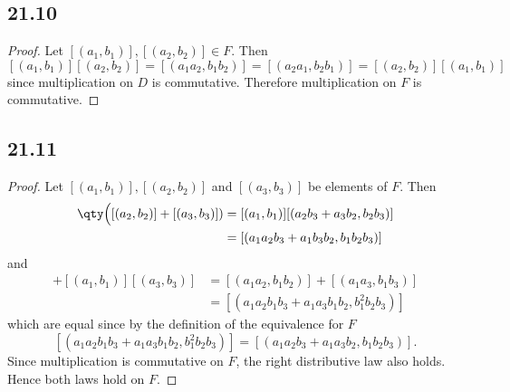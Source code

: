 \documentclass[12pt,titlepage]{extarticle}
\begin{document}
\subsection*{21.10}
\begin{proof}
    Let $[(a_1,b_1)], [(a_2, b_2)] \in F$. Then
    \[
        [(a_1, b_1)][(a_2, b_2)] = [(a_1 a_2, b_1 b_2)] = [(a_2 a_1, b_2 b_1)] = [(a_2, b_2)] [(a_1, b_1)]
    \]
    since multiplication on $D$ is commutative. Therefore multiplication on $F$ is commutative.
\end{proof}

\subsection*{21.11}
\begin{proof}
    Let $[(a_1,b_1)], [(a_2,b_2)]$ and $[(a_3, b_3)]$ be elements of $F$. Then
    \begin{align*}
        [(a_1, b_1)] \qty\Big([(a_2, b_2)] + [(a_3, b_3)]) &= [(a_1, b_1)] [(a_2 b_3 + a_3 b_2, b_2 b_3)] \\ 
               &= [(a_1 a_2 b_3 + a_1 b_3 b_2, b_1 b_2 b_3)]
    \end{align*}
    and
    \begin{align*}
        [(a_1, b_1)] [(a_2, b_2)] + [(a_1, b_1)] [(a_3, b_3)] &= [(a_1 a_2, b_1 b_2)] + [(a_1 a_3, b_1 b_3)] \\
                  &= [(
                  a_1 a_2 b_1 b_3 + a_1 a_3 b_1 b_2, b_1^2 b_2 b_3
                  )]
    \end{align*}
    which are equal since by the definition of the equivalence for $F$
    \[
        [(
            a_1 a_2 b_1 b_3 + a_1 a_3 b_1 b_2, b_1^2 b_2 b_3
        )] = 
        [(
            a_1 a_2 b_3 + a_1 a_3 b_2, b_1 b_2 b_3
        )]
    .\]
    Since multiplication is commutative on $F$, the right distributive law also holds. Hence both laws hold on $F$.
\end{proof}
\end{document}
